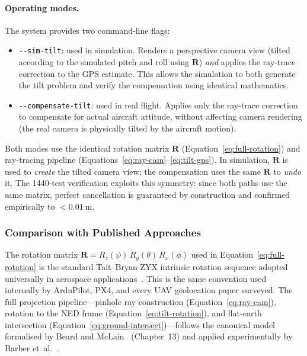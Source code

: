 \paragraph{Operating modes.}
The system provides two command-line flags:

\begin{itemize}
  \item \texttt{-{}-sim-tilt}: used in simulation.  Renders a perspective camera view (tilted according to the simulated pitch and roll using $\mathbf{R}$) \emph{and} applies the ray-trace correction to the GPS estimate.  This allows the simulation to both generate the tilt problem and verify the compensation using identical mathematics.
  \item \texttt{-{}-compensate-tilt}: used in real flight.  Applies only the ray-trace correction to compensate for actual aircraft attitude, without affecting camera rendering (the real camera is physically tilted by the aircraft motion).
\end{itemize}

\noindent Both modes use the identical rotation matrix $\mathbf{R}$ (Equation~\ref{eq:full-rotation}) and ray-tracing pipeline (Equations~\ref{eq:ray-cam}--\ref{eq:tilt-gps}).  In simulation, $\mathbf{R}$ is used to \emph{create} the tilted camera view; the compensation uses the same $\mathbf{R}$ to \emph{undo} it.  The 1440-test verification exploits this symmetry: since both paths use the same matrix, perfect cancellation is guaranteed by construction and confirmed empirically to $< \SI{0.01}{\metre}$.

\subsubsection{Comparison with Published Approaches}\label{sec:literature-comparison}

The rotation matrix $\mathbf{R} = R_z(\psi)\,R_y(\theta)\,R_x(\phi)$ used in Equation~\ref{eq:full-rotation} is the standard Tait--Bryan ZYX intrinsic rotation sequence adopted universally in aerospace applications~\cite{beard2012small,barber2006vision}.  This is the same convention used internally by ArduPilot, PX4, and every UAV geolocation paper surveyed.  The full projection pipeline---pinhole ray construction (Equation~\ref{eq:ray-cam}), rotation to the NED frame (Equation~\ref{eq:tilt-rotation}), and flat-earth intersection (Equation~\ref{eq:ground-intersect})---follows the canonical model formalised by Beard and McLain~\cite{beard2012small} (Chapter~13) and applied experimentally by Barber et~al.~\cite{barber2006vision}.

